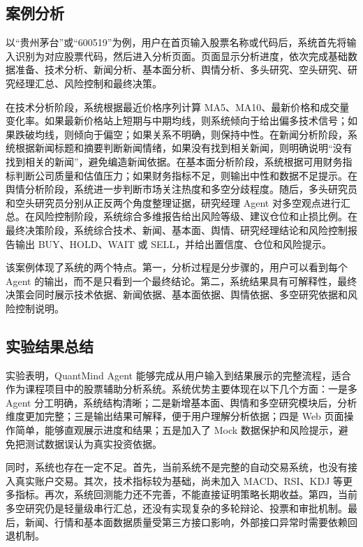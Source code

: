 \documentclass[UTF8,a4paper,12pt]{ctexart}
\begin{document}
\subsection{案例分析}

以“贵州茅台”或“600519”为例，用户在首页输入股票名称或代码后，系统首先将输入识别为对应股票代码，然后进入分析页面。页面显示分析进度，依次完成基础数据准备、技术分析、新闻分析、基本面分析、舆情分析、多头研究、空头研究、研究经理汇总、风险控制和最终决策。

在技术分析阶段，系统根据最近价格序列计算 MA5、MA10、最新价格和成交量变化率。如果最新价格站上短期与中期均线，则系统倾向于给出偏多技术信号；如果跌破均线，则倾向于偏空；如果关系不明确，则保持中性。在新闻分析阶段，系统根据新闻标题和摘要判断新闻情绪，如果没有找到相关新闻，则明确说明“没有找到相关的新闻”，避免编造新闻依据。在基本面分析阶段，系统根据可用财务指标判断公司质量和估值压力；如果财务指标不足，则输出中性和数据不足提示。在舆情分析阶段，系统进一步判断市场关注热度和多空分歧程度。随后，多头研究员和空头研究员分别从正反两个角度整理证据，研究经理 Agent 对多空观点进行汇总。在风险控制阶段，系统综合多维报告给出风险等级、建议仓位和止损比例。在最终决策阶段，系统综合技术、新闻、基本面、舆情、研究经理结论和风险控制报告输出 BUY、HOLD、WAIT 或 SELL，并给出置信度、仓位和风险提示。

该案例体现了系统的两个特点。第一，分析过程是分步骤的，用户可以看到每个 Agent 的输出，而不是只看到一个最终结论。第二，系统结果具有可解释性，最终决策会同时展示技术依据、新闻依据、基本面依据、舆情依据、多空研究依据和风险控制说明。

\subsection{实验结果总结}

实验表明，QuantMind Agent 能够完成从用户输入到结果展示的完整流程，适合作为课程项目中的股票辅助分析系统。系统优势主要体现在以下几个方面：一是多 Agent 分工明确，系统结构清晰；二是新增基本面、舆情和多空研究模块后，分析维度更加完整；三是输出结果可解释，便于用户理解分析依据；四是 Web 页面操作简单，能够直观展示进度和结果；五是加入了 Mock 数据保护和风险提示，避免把测试数据误认为真实投资依据。

同时，系统也存在一定不足。首先，当前系统不是完整的自动交易系统，也没有接入真实账户交易。其次，技术指标较为基础，尚未加入 MACD、RSI、KDJ 等更多指标。再次，系统回测能力还不完善，不能直接证明策略长期收益。第四，当前多空研究仍是轻量级串行汇总，还没有实现复杂的多轮辩论、投票和审批机制。最后，新闻、行情和基本面数据质量受第三方接口影响，外部接口异常时需要依赖回退机制。
\end{document}
